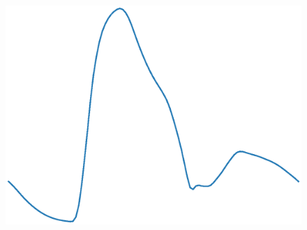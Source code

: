 \documentclass{beamer}
\begin{document}
\begin{frame}
\begin{figure}[htbp]
\begin{minipage}[c][0.35\paperheight][c]{\linewidth}
\begin{minipage}{0.1\linewidth}
			\end{minipage}
			\begin{minipage}{0.19\linewidth}
				\includegraphics[width=\linewidth]{images/adan56_tibiofibular_trunk_L_P.eps}
			\end{minipage}
			\begin{minipage}{0.1\linewidth}
				\caption*{\tiny}
			\end{minipage}
		\end{minipage}
	\end{figure}
\end{frame}
\end{document}
